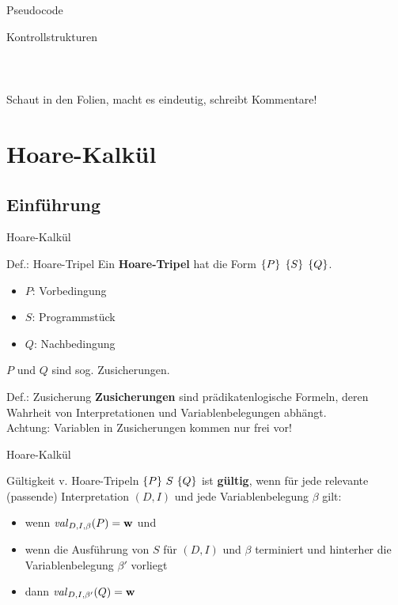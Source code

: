 \begin{frame}{Pseudocode}
\begin{block}{Kontrollstrukturen}
\begin{columns}
\begin{column}{0.45\textwidth}
\begin{tabular}[t]{ll}
   			\end{tabular}
		\end{column}
	\end{columns}

	Schaut in den Folien, macht es eindeutig, schreibt Kommentare!
\end{block}
    


\end{frame}




\section{Hoare-Kalkül}
\subsection{Einführung}
\begin{frame}{Hoare-Kalkül}
	\begin{block}{Def.: Hoare-Tripel}
		Ein \textbf{Hoare-Tripel} hat die Form \textcolor{kit-red100}{$\left\{ P \right\}$} {$\left\{ S \right\}$} \textcolor{kit-red100}{$\left\{ Q \right\}$}.
		\begin{itemize}
			\item \textcolor{kit-red100}{$P$}: Vorbedingung
			\item $S$: Programmstück
			\item \textcolor{kit-red100}{$Q$}: Nachbedingung
		\end{itemize}
		$P$ und $Q$ sind sog. Zusicherungen.
	\end{block}

	\begin{block}{Def.: Zusicherung}
		\textbf{Zusicherungen} sind prädikatenlogische Formeln, deren Wahrheit von Interpretationen und Variablenbelegungen abhängt.\\
		Achtung: Variablen in Zusicherungen kommen nur frei vor!
	\end{block}
\end{frame}

\begin{frame}{Hoare-Kalkül}
	\begin{block}{Gültigkeit v. Hoare-Tripeln}
		$\left\{ P \right\} \, S \, \left\{ Q \right\}$ ist \textbf{gültig}, wenn für jede relevante (passende) Interpretation $(D,I)$ und jede Variablenbelegung $\beta$ gilt:
		\begin{itemize}
			\item wenn $\hbox{\textit{val}}_{D,I,\beta}(P) = \mathbf{w}$ und
			\item wenn die Ausführung von $S$ für $(D,I)$ und $\beta$ terminiert und hinterher die Variablenbelegung $\beta'$ vorliegt
			\item dann $\hbox{\textit{val}}_{D,I,\beta'}(Q) = \mathbf{w}$
		\end{itemize}
	\end{block}
\end{frame}





